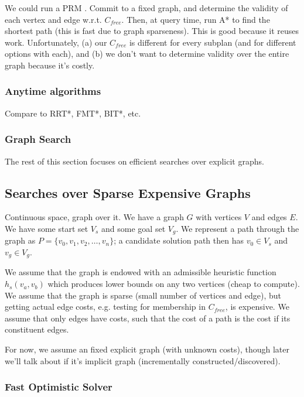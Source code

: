 \documentclass{article}
\begin{document}
We could run a PRM \cite{kavrakietal1996prm}.
Commit to a fixed graph,
and determine the validity of each vertex and edge w.r.t. $C_{free}$.
Then, at query time,
run A* to find the shortest path (this is fast due to graph sparseness).
This is good because it reuses work.
Unfortunately,
(a) our $C_{free}$ is different for every subplan
(and for different options with each),
and (b) we don't want to determine validity over the entire graph
because it's costly.

\subsubsection{Anytime algorithms}

Compare to RRT*, FMT*, BIT*, etc.

\subsubsection{Graph Search}

The rest of this section focuses on efficient searches over explicit graphs.

\subsection{Searches over Sparse Expensive Graphs}

Continuous space, graph over it.
We have a graph $G$ with vertices $V$ and edges $E$.
We have some start set $V_s$ and some goal set $V_g$.
We represent a path through the graph as
$P = \{ v_0, v_1, v_2, \dots, v_n \}$;
a candidate solution path then has $v_0 \in V_s$ and $v_g \in V_g$.

We assume that the graph is endowed with an admissible heuristic function
$h_s(v_a,v_b)$
which produces lower bounds on any two vertices (cheap to compute).
We assume that the graph is sparse (small number of vertices and edge),
but getting actual edge costs,
e.g. testing for membership in $C_{free}$,
is expensive.
We assume that only edges have costs,
such that the cost of a path is the cost if its constituent edges.

For now, we assume an fixed explicit graph (with unknown costs),
though later we'll talk about if it's implicit graph (incrementally
constructed/discovered).

\subsubsection{Fast Optimistic Solver}
\end{document}
